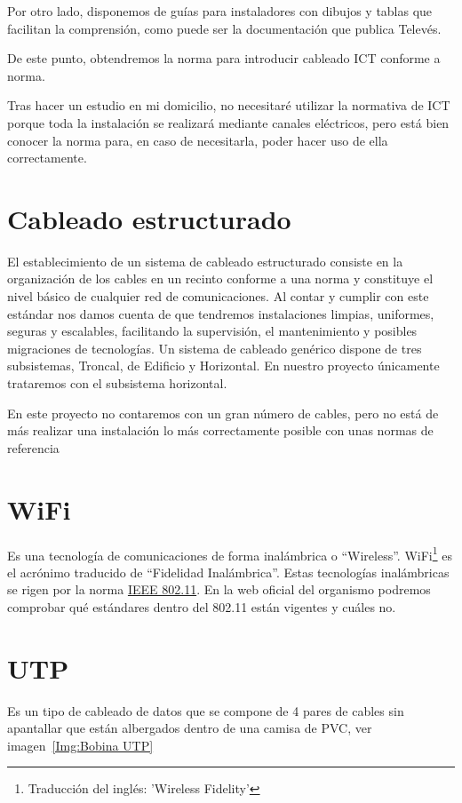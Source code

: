 Por otro lado, disponemos de guías para instaladores con dibujos y tablas que facilitan la comprensión, como puede ser la documentación que publica Televés\cite{manual:ICT-Televes}.

De este punto, obtendremos la norma para introducir cableado ICT\cite{manual:ICT} conforme a norma.

Tras hacer un estudio en mi domicilio, no necesitaré utilizar la normativa de ICT\cite{manual:ICT} porque toda la instalación se realizará mediante canales eléctricos, pero está bien conocer la norma para, en caso de necesitarla, poder hacer uso de ella correctamente.

\section{Cableado estructurado}
El establecimiento de un sistema de cableado estructurado consiste en la organización de los cables en un recinto conforme a una norma y constituye el nivel básico de cualquier red de comunicaciones.
Al contar y cumplir con este estándar nos damos cuenta de que tendremos instalaciones limpias, uniformes, seguras y escalables, facilitando la supervisión, el mantenimiento y posibles migraciones de tecnologías.
Un sistema de cableado genérico dispone de tres subsistemas, Troncal, de Edificio y Horizontal. En nuestro proyecto únicamente trataremos con el subsistema horizontal.

En este proyecto no contaremos con un gran número de cables, pero no está de más realizar una instalación lo más correctamente posible con unas normas de referencia

\section{WiFi}
Es una tecnología de comunicaciones de forma inalámbrica o “Wireless”. WiFi\footnote{Traducción del inglés: 'Wireless Fidelity'} es el acrónimo traducido de “Fidelidad Inalámbrica”.
Estas tecnologías inalámbricas se rigen por la norma \underline{IEEE 802.11}\cite{manual:IEEE802.11}.
En la web oficial del organismo podremos comprobar qué estándares dentro del 802.11 están vigentes y cuáles no.

\section{UTP}
Es un tipo de cableado de datos que se compone de 4 pares de cables sin apantallar que están albergados dentro de una camisa de PVC, ver imagen~\ref{Img:Bobina UTP}

